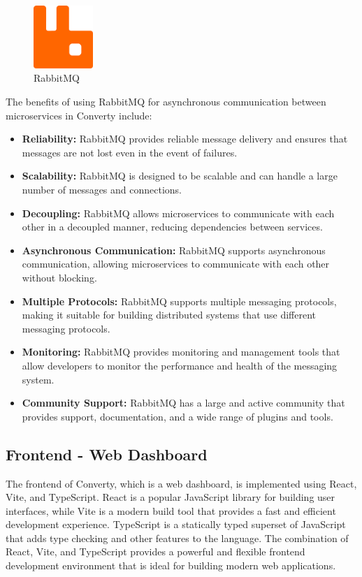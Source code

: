 \begin{figure}[H]
    \centering
    \includegraphics[width=0.2\textwidth]{Images/rabbitmq.png}
    \caption{RabbitMQ}
    \label{fig:rabbitmq}
\end{figure}

The benefits of using RabbitMQ for asynchronous communication between microservices in Converty include:

\begin{itemize}
    \item \textbf{Reliability:} RabbitMQ provides reliable message delivery and ensures that messages are not lost even in the event of failures.
    \item \textbf{Scalability:} RabbitMQ is designed to be scalable and can handle a large number of messages and connections.
    \item \textbf{Decoupling:} RabbitMQ allows microservices to communicate with each other in a decoupled manner, reducing dependencies between services.
    \item \textbf{Asynchronous Communication:} RabbitMQ supports asynchronous communication, allowing microservices to communicate with each other without blocking.
    \item \textbf{Multiple Protocols:} RabbitMQ supports multiple messaging protocols, making it suitable for building distributed systems that use different messaging protocols.
    \item \textbf{Monitoring:} RabbitMQ provides monitoring and management tools that allow developers to monitor the performance and health of the messaging system.
    \item \textbf{Community Support:} RabbitMQ has a large and active community that provides support, documentation, and a wide range of plugins and tools.
\end{itemize}

\subsection{Frontend - Web Dashboard}
The frontend of Converty, which is a web dashboard, is implemented using React, Vite, and TypeScript. React is a popular JavaScript library for building user interfaces, while Vite is a modern build tool that provides a fast and efficient development experience. TypeScript is a statically typed superset of JavaScript that adds type checking and other features to the language. The combination of React, Vite, and TypeScript provides a powerful and flexible frontend development environment that is ideal for building modern web applications.

